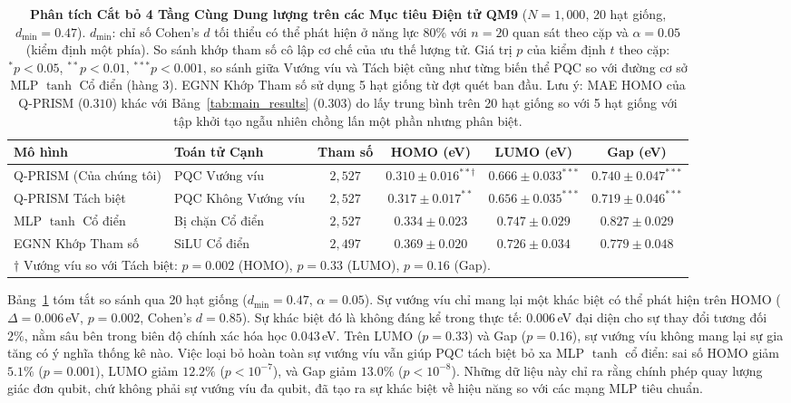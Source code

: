 \documentclass[10pt,twocolumn,letterpaper]{article}
\begin{document}
\begin{table}[t]
\centering
\small
\caption{\textbf{Phân tích Cắt bỏ 4 Tầng Cùng Dung lượng trên các Mục tiêu Điện tử QM9} ($N = 1{,}000$, 20 hạt giống, $d_{\min} = 0.47$). $d_{\min}$: chỉ số Cohen's $d$ tối thiểu có thể phát hiện ở năng lực 80\% với $n = 20$ quan sát theo cặp và $\alpha = 0.05$ (kiểm định một phía). So sánh khớp tham số cô lập cơ chế của ưu thế lượng tử. Giá trị $p$ của kiểm định $t$ theo cặp: $^{*}p < 0.05$, $^{**}p < 0.01$, $^{***}p < 0.001$, so sánh giữa Vướng víu và Tách biệt cũng như từng biến thể PQC so với đường cơ sở MLP $\tanh$ Cổ điển (hàng 3). EGNN Khớp Tham số sử dụng 5 hạt giống từ đợt quét ban đầu. Lưu ý: MAE HOMO của Q-PRISM ($0.310$) khác với Bảng~\ref{tab:main_results} ($0.303$) do lấy trung bình trên 20 hạt giống so với 5 hạt giống với tập khởi tạo ngẫu nhiên chồng lấn một phần nhưng phân biệt.}
\label{tab:iso_ablation}
\begin{tabular}{llcccc}
\toprule
\textbf{Mô hình} & \textbf{Toán tử Cạnh} & \textbf{Tham số} & \textbf{HOMO (eV)} & \textbf{LUMO (eV)} & \textbf{Gap (eV)} \\
\midrule
Q-PRISM (Của chúng tôi) & PQC Vướng víu & $2{,}527$ & $\mathbf{0.310 \pm 0.016}^{**\dagger}$ & $0.666 \pm 0.033^{***}$ & $0.740 \pm 0.047^{***}$ \\
Q-PRISM Tách biệt & PQC Không Vướng víu & $2{,}527$ & $0.317 \pm 0.017^{**}$ & $\mathbf{0.656 \pm 0.035}^{***}$ & $\mathbf{0.719 \pm 0.046}^{***}$ \\
MLP $\tanh$ Cổ điển & Bị chặn Cổ điển & $2{,}527$ & $0.334 \pm 0.023$ & $0.747 \pm 0.029$ & $0.827 \pm 0.029$ \\
EGNN Khớp Tham số & SiLU Cổ điển & $2{,}497$ & $0.369 \pm 0.020$ & $0.726 \pm 0.034$ & $0.779 \pm 0.048$ \\
\bottomrule
\multicolumn{6}{l}{\footnotesize $\dagger$ Vướng víu so với Tách biệt: $p = 0.002$ (HOMO), $p = 0.33$ (LUMO), $p = 0.16$ (Gap).}
\end{tabular}
\end{table}

Bảng~\ref{tab:iso_ablation} tóm tắt so sánh qua 20 hạt giống ($d_{\min} = 0.47$, $\alpha = 0.05$). Sự vướng víu chỉ mang lại một khác biệt có thể phát hiện trên HOMO ($\Delta = 0.006$\,eV, $p = 0.002$, Cohen's $d = 0.85$). Sự khác biệt đó là không đáng kể trong thực tế: $0.006$\,eV đại diện cho sự thay đổi tương đối $2\%$, nằm sâu bên trong biên độ chính xác hóa học $0.043$\,eV. Trên LUMO ($p = 0.33$) và Gap ($p = 0.16$), sự vướng víu không mang lại sự gia tăng có ý nghĩa thống kê nào. Việc loại bỏ hoàn toàn sự vướng víu vẫn giúp PQC tách biệt bỏ xa MLP $\tanh$ cổ điển: sai số HOMO giảm $5.1\%$ ($p = 0.001$), LUMO giảm $12.2\%$ ($p < 10^{-7}$), và Gap giảm $13.0\%$ ($p < 10^{-8}$). Những dữ liệu này chỉ ra rằng chính phép quay lượng giác đơn qubit, chứ không phải sự vướng víu đa qubit, đã tạo ra sự khác biệt về hiệu năng so với các mạng MLP tiêu chuẩn.
\end{document}

